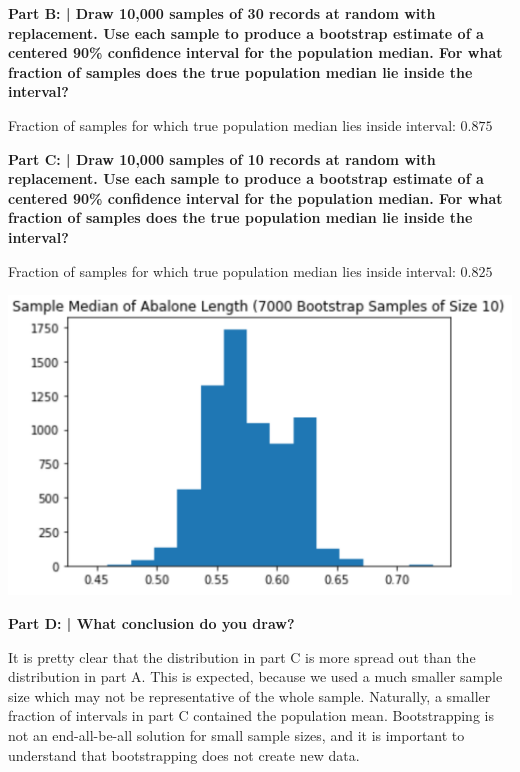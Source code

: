 \documentclass{article}
\begin{document}
 \textbf{Part B: | Draw 10,000 samples of 30 records at random with replacement. Use each sample to produce a bootstrap estimate of a centered 90\% confidence interval for the population median. For what fraction of samples does the true population median lie inside the interval?}\newline
 
 Fraction of samples for which true population median lies inside interval: $0.875$
 
 \textbf{Part C: | Draw 10,000 samples of 10 records at random with replacement. Use each sample to produce a bootstrap estimate of a centered 90\% confidence interval for the population median. For what fraction of samples does the true population median lie inside the interval?}\newline
 
 Fraction of samples for which true population median lies inside interval: $0.825$
 
 \includegraphics{HW7_2.PNG}
 
 \textbf{Part D: | What conclusion do you draw?}\newline
 
 It is pretty clear that the distribution in part C is more spread out than the distribution in part A. This is expected, because we used a much smaller sample size which may not be representative of the whole sample. Naturally, a smaller fraction of intervals in part C contained the population mean. Bootstrapping is not an end-all-be-all solution for small sample sizes, and it is important to understand that bootstrapping does not create new data.
 
 \newpage
 
 \noindent\makebox[\linewidth]{\rule{\paperwidth}{0.4pt}}\newline
 
\end{document}
